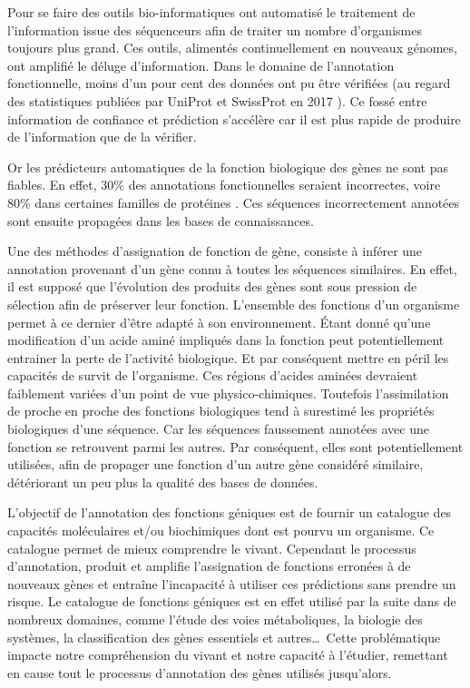 \begin{refsegment}
Pour se faire des outils bio-informatiques ont automatisé le traitement de l'information issue des séquenceurs afin de traiter un nombre d'organismes toujours plus grand. Ces outils, alimentés continuellement en nouveaux génomes, ont amplifié le déluge d'information. Dans le domaine de l'annotation fonctionnelle, moins d'un pour cent des données ont pu être vérifiées (au regard des statistiques publiées par UniProt et SwissProt en 2017 \parencites{uniprot_stat}{expasy_stat} ). Ce fossé entre information de confiance et prédiction s'accélère car il est plus rapide de produire de l'information que de la vérifier.

Or les prédicteurs automatiques de la fonction biologique des gènes ne sont pas fiables. En effet, 30\% des annotations fonctionnelles seraient incorrectes, voire 80\% dans certaines familles de protéines \parencites{devos2001intrinsic}{schnoes2009annotation}. Ces séquences incorrectement annotées sont ensuite propagées dans les bases de connaissances.

Une des méthodes d'assignation de fonction de gène, consiste à inférer une annotation provenant d'un gène connu à toutes les séquences similaires. En effet, il est supposé que l'évolution des produits des gènes sont sous pression de sélection afin de préserver leur fonction. L'ensemble des fonctions d'un organisme permet à ce dernier d'être adapté à son environnement. Étant donné qu'une modification d'un acide aminé impliqués dans la fonction peut potentiellement entrainer la perte de l'activité biologique. Et par conséquent mettre en péril les capacités de survit de l'organisme. Ces régions d'acides aminées devraient faiblement variées d'un point de vue physico-chimiques. Toutefois l'assimilation de proche en proche des fonctions biologiques tend à surestimé les propriétés biologiques d'une séquence. Car les séquences faussement annotées avec une fonction se retrouvent parmi les autres. Par conséquent, elles sont potentiellement utilisées, afin de propager une fonction d'un autre gène considéré similaire, détériorant un peu plus la qualité des bases de données.

L'objectif de l'annotation des fonctions géniques est de fournir un catalogue des capacités moléculaires et/ou biochimiques dont est pourvu un organisme. Ce catalogue permet de mieux comprendre le vivant. Cependant le processus d'annotation, produit et amplifie l'assignation de fonctions erronées à de nouveaux gènes et entraîne l'incapacité à utiliser ces prédictions sans prendre un risque. Le catalogue de fonctions géniques est en effet utilisé par la suite dans de nombreux domaines, comme l'étude des voies métaboliques, la biologie des systèmes, la classification des gènes essentiels et autres\ldots~Cette problématique impacte notre compréhension du vivant et notre capacité à l'étudier, remettant en cause tout le processus d'annotation des gènes utilisés jusqu'alors.


\end{refsegment}
